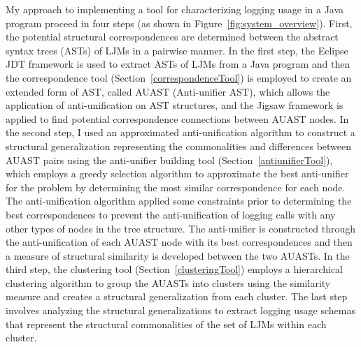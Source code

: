 My approach to implementing a tool for characterizing logging usage in a Java program proceed in four steps (as shown in Figure~\ref{fig:system_overview}). First, the potential structural correspondences are determined between the abstract syntax trees (ASTs) of LJMs in a pairwise manner. In the first step, the Eclipse JDT framework is used to extract ASTs of LJMs from a Java program and then the correspondence tool (Section~\ref{correspondenceTool}) is employed to create an extended form of AST, called AUAST (Anti-unifier AST), which allows the application of anti-unification on AST structures, and the Jigsaw framework is applied to find potential correspondence connections between AUAST nodes.
In the second step, I used an approximated anti-unification algorithm to construct a structural generalization representing the commonalities and differences between AUAST pairs using the anti-unifier building tool (Section~\ref{antiunifierTool}), which employs a greedy selection algorithm to approximate the best anti-unifier for the problem by determining the most similar correspondence for each node. The anti-unification algorithm applied some constraints prior to determining the best correspondences to prevent the anti-unification of logging calls with any other types of nodes in the tree structure. The anti-unifier is constructed through the anti-unification of each AUAST node with its best correspondences and then a measure of structural similarity is developed between the two AUASTs.
In the third step, the clustering tool (Section~\ref{clusteringTool}) employs a hierarchical clustering algorithm to group the AUASTs into clusters using the similarity measure and creates a structural generalization from each cluster. The last step involves analyzing the structural generalizations to extract logging usage schemas that represent the structural commonalities of the set of LJMs within each cluster. 


